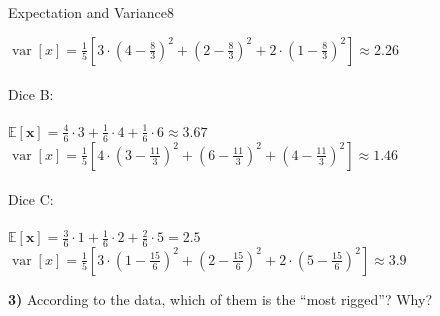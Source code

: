 \begin{questions}
\begin{question}{Expectation and Variance}{8}
\begin{answer}
$\operatorname{var}[x]=\frac{1}{5}[3\cdot(4-\frac{8}{3})^{2}+(2-\frac{8}{3})^{2}+2\cdot(1-\frac{8}{3})^{2}] \approx  2.26$\\ \\
Dice B:\\ \\
$\mathbb{E}[ \mathbf{x}] = \frac{4}{6}\cdot3 + \frac{1}{6}\cdot4 + \frac{1}{6}\cdot6 \approx 3.67$\\
$\operatorname{var}[x]=\frac{1}{5}[4\cdot(3-\frac{11}{3})^{2}+(6-\frac{11}{3})^{2}+(4-\frac{11}{3})^{2}] \approx  1.46$\\ \\
Dice C:\\ \\
$\mathbb{E}[ \mathbf{x}] = \frac{3}{6}\cdot1 + \frac{1}{6}\cdot2 + \frac{2}{6}\cdot5 =2.5$\\
$\operatorname{var}[x]=\frac{1}{5}[3\cdot(1-\frac{15}{6})^{2}+(2-\frac{15}{6})^{2}+2\cdot(5-\frac{15}{6})^{2}] \approx  3.9$\\
\end{answer}
\textbf{3)} According to the data, which of them is the ``most rigged''? Why?


\end{question}
\end{questions}

